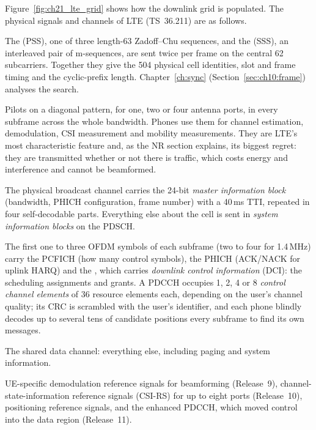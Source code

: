 Figure~\ref{fig:ch21_lte_grid} shows how the downlink grid is populated. The physical signals and
channels of LTE (TS~36.211) are as follows.
\begin{description}[style=nextline,leftmargin=1.2em,font=\sffamily\bfseries\small\color{navy}]
\item[Synchronisation signals.] The  (PSS), one of three
length-63 Zadoff--Chu sequences, and the  (SSS), an
interleaved pair of m-sequences, are sent twice per frame on the central 62 subcarriers. Together
they give the 504 physical cell identities, slot and frame timing and the cyclic-prefix length.
Chapter~\ref{ch:sync} (Section~\ref{sec:ch10:frame}) analyses the search.
\item[Cell-specific reference signals (CRS).] Pilots on a diagonal pattern, for one, two or four
antenna ports, in every subframe across the whole bandwidth. Phones use them for channel estimation,
demodulation, CSI measurement and mobility measurements. They are LTE's most characteristic feature
and, as the NR section explains, its biggest regret: they are transmitted whether or not there is
traffic, which costs energy and interference and cannot be beamformed.

\item[PBCH.] The physical broadcast channel carries the 24-bit \emph{master information block}
(bandwidth, PHICH configuration, frame number) with a 40\,ms TTI, repeated in four self-decodable
parts. Everything else about the cell is sent in \emph{system information blocks} on the PDSCH.
\item[Control region.] The first one to three OFDM symbols of each subframe (two to four for
1.4\,MHz) carry the PCFICH (how many control symbols), the PHICH (ACK/NACK for uplink HARQ) and the
, which carries \emph{downlink control information} (DCI): the scheduling assignments and
grants. A PDCCH occupies 1, 2, 4 or 8 \emph{control channel elements} of 36 resource elements each,
depending on the user's channel quality; its CRC is scrambled with the user's identifier, and each
phone blindly decodes up to several tens of candidate positions every subframe to find its own
messages.
\item[PDSCH.] The shared data channel: everything else, including paging and system information.
\item[Later additions.] UE-specific demodulation reference signals for beamforming (Release~9),
channel-state-information reference signals (CSI-RS) for up to eight ports (Release~10),
positioning reference signals, and the enhanced PDCCH, which moved control into the data region
(Release~11).
\end{description}

